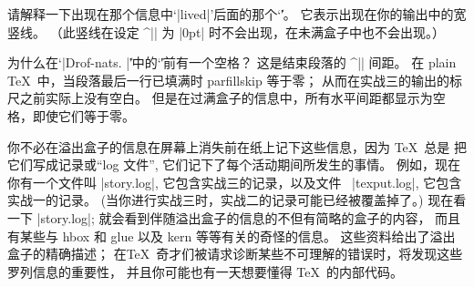 \dangerexercise 请解释一下出现在那个信息中`|lived|'后面的那个`\|'。
\answer 它表示出现在你的输出中的宽竖线。%
（此竖线在设定 ^|\overfullrule| 为 |0pt| 时不会出现，在未满盒子中也不会出现。）

\ddangerexercise 为什么在`|Drof-nats. |\|'中的`\|'前有一个空格？
\answer 这是结束段落的 ^|\parfillskip| 间距。
在 plain \TeX\ 中，当段落最后一行已填满时 parfillskip 等于零；
从而在实战三的输出的标尺之前实际上没有空白。
但是在过满盒子的信息中，所有水平间距都显示为空格，即使它们等于零。

你不必在溢出盒子的信息在屏幕上消失前在纸上记下这些信息，因为 \TeX\ 总是%
把它们写成记录或``log 文件'', 它们记下了每个活动期间所发生的事情。%
例如，现在你有一个文件叫 |story.log|, 它包含实战三的记录，以及文件%
~|texput.log|, 它包含实战一的记录。%
(当你进行实战三时，实战二的记录可能已经被覆盖掉了。)
现在看一下 |story.log|; 就会看到伴随溢出盒子的信息的不但有简略的盒子的内容，
而且有某些与 hbox 和 glue 以及 kern 等等有关的奇怪的信息。%
这些资料给出了溢出盒子的精确描述；
在\TeX\ 奇才们被请求诊断某些不可理解的错误时，将发现这些罗列信息的重要性，
并且你可能也有一天想要懂得 \TeX\ 的内部代码。

